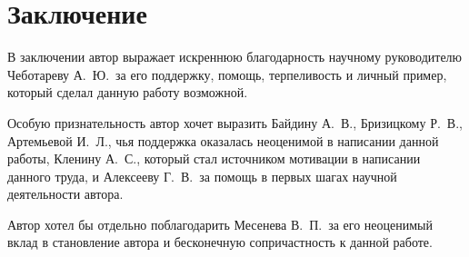 \chapter*{Заключение}                       %



В заключении автор выражает искреннюю благодарность научному руководителю
Чеботареву А.\ Ю.\ за его поддержку,
помощь, терпеливость и личный пример,
который сделал данную работу возможной.

Особую признательность автор хочет выразить Байдину А.\ В.,
Бризицкому Р.\ В., Артемьевой И.\ Л., чья поддержка оказалась
неоценимой в написании данной работы,
Кленину А.\ С., который стал источником мотивации в написании данного труда,
и Алексееву Г.\ В.\ за помощь в первых шагах научной деятельности автора.

Автор хотел бы отдельно поблагодарить Месенева В.\ П.\
за его неоценимый вклад в становление автора и бесконечную сопричастность к данной работе.
